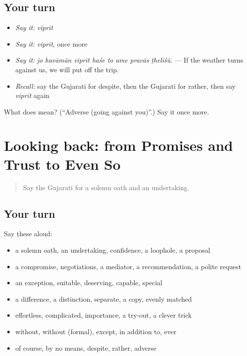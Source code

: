 \subsection*{Your turn}
\begin{itemize}
\raggedright
  \item \emph{Say it:} \emph{viprīt}
  \item \emph{Say it:} \emph{viprīt}, once more
  \item \emph{Say it:} \emph{jo havāmān viprīt haśe to ame pravās ṭhelīśũ.} — If the weather turns against us, we will put off the trip.
  \item \emph{Recall:} say the Gujarati for despite, then the Gujarati for rather, then say \emph{viprīt} again
\end{itemize}

\begin{tcolorbox}[breakable,colback=teal!4,colframe=teal!35!black,title={Before you move on}]
What does  mean? (\textquotedblleft{}Adverse (going against you)\textquotedblright{}.) Say it once more.
\end{tcolorbox}
\section[(dialogue)]{Looking back: from Promises and Trust to Even So}

\label{lesson:GU-R547-review-541-547}



\begin{quote}
Say the Gujarati for a solemn oath and an undertaking.
\end{quote}

\subsection*{Your turn}
Say these aloud:

\begin{itemize}
\raggedright
  \item a solemn oath, an undertaking, confidence, a loophole, a proposal
  \item a compromise, negotiations, a mediator, a recommendation, a polite request
  \item an exception, suitable, deserving, capable, special
  \item a difference, a distinction, separate, a copy, evenly matched
  \item effortless, complicated, importance, a try-out, a clever trick
  \item without, without (formal), except, in addition to, ever
  \item of course, by no means, despite, rather, adverse
\end{itemize}

